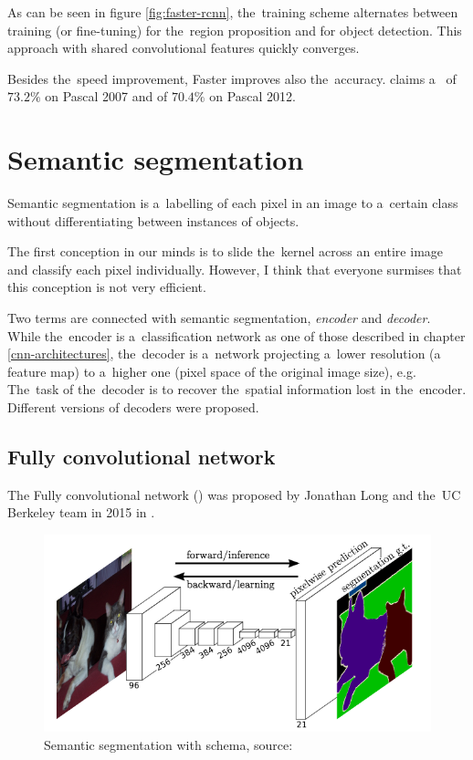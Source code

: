 As can be seen in figure \ref{fig:faster-rcnn}, the~training scheme alternates 
between training (or fine-tuning) for the~region proposition and for object 
detection. This approach with shared convolutional features quickly converges.

Besides the~speed improvement, Faster  improves also the~accuracy. 
\cite{faster-rcnn} claims a~ of $73.2 \%$ on Pascal  2007 and of 
$70.4 \%$ on Pascal  2012.


\section{Semantic segmentation}
\label{semantic-segmentation}

Semantic segmentation is a~labelling of each pixel in an image to a~certain 
class without differentiating between instances of objects.

The first conception in our minds is to slide the~kernel across an entire image 
and classify each pixel individually. However, I think that everyone surmises 
that this conception is not very efficient.

Two terms are connected with semantic segmentation, \textit{encoder} and 
\textit{decoder}. While the~encoder is a~classification network as one of those 
described in chapter \ref{cnn-architectures}, the~decoder is a~network 
projecting a~lower resolution (a feature map) to a~higher one (pixel space of 
the original image size), e.g. The~task of the~decoder is to recover the~spatial 
information lost in the~encoder. Different versions of decoders were proposed.

\subsection{Fully convolutional network}
\label{fcns}

The Fully convolutional network () was proposed by Jonathan Long and
the~UC Berkeley team in 2015 in \cite{fcns}.

\begin{figure}[H]
   \centering
	\includegraphics[width=.8\linewidth]{./pictures/fcns.png}
	\caption[Fully convolutional network]{Semantic segmentation with  
schema, source: \cite{fcns}}
      \label{fig:fcns}
\end{figure}


